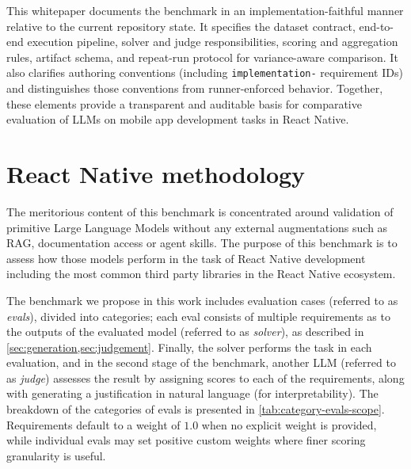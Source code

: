 \documentclass[11pt]{article}
\begin{document}
This whitepaper documents the benchmark in an implementation-faithful manner relative to the current repository state. It specifies the dataset contract, end-to-end execution pipeline, solver and judge responsibilities, scoring and aggregation rules, artifact schema, and repeat-run protocol for variance-aware comparison. It also clarifies authoring conventions (including \texttt{implementation-} requirement IDs) and distinguishes those conventions from runner-enforced behavior. Together, these elements provide a transparent and auditable basis for comparative evaluation of LLMs on mobile app development tasks in React Native.

\section{React Native methodology}

The meritorious content of this benchmark is concentrated around validation of primitive Large Language Models without any external augmentations such as RAG, documentation access or agent skills. The purpose of this benchmark is to assess how those models perform in the task of React Native development including the most common third party libraries in the React Native ecosystem.

The benchmark we propose in this work includes evaluation cases (referred to as \textit{evals}), divided into categories; each eval consists of multiple requirements as to the outputs of the evaluated model (referred to as \textit{solver}), as described in \cref{sec:generation,sec:judgement}. Finally, the solver performs the task in each evaluation, and in the second stage of the benchmark, another LLM (referred to as \textit{judge}) assesses the result by assigning scores to each of the requirements, along with generating a justification in natural language (for interpretability). The breakdown of the categories of evals is presented in \cref{tab:category-evals-scope}. Requirements default to a weight of $1.0$ when no explicit weight is provided, while individual evals may set positive custom weights where finer scoring granularity is useful.
\end{document}
